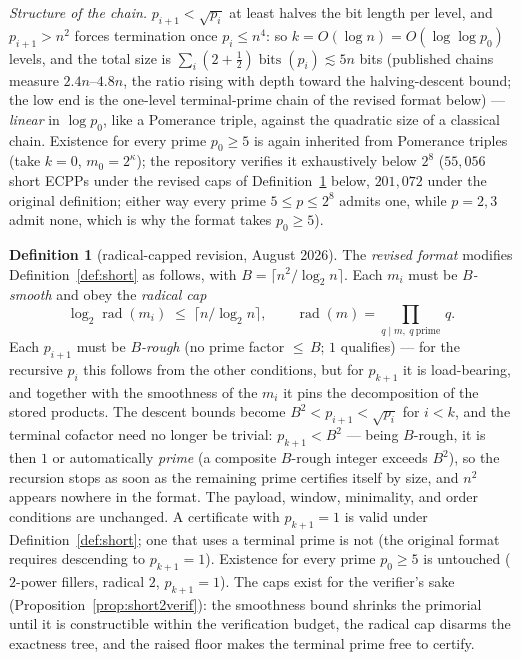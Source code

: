 \documentclass[11pt]{amsart}
\theoremstyle{plain}
\theoremstyle{definition}
\newtheorem{definition}[theorem]{Definition}
\theoremstyle{remark}
\begin{document}
\emph{Structure of the chain.}  $p_{i+1} < \sqrt{p_i}$ at least halves the bit length per level, and
$p_{i+1} > n^2$ forces termination once $p_i \le n^4$: so $k = O(\log n) = O(\log\log p_0)$ levels, and
the total size is $\sum_i (2+\tfrac12)\operatorname{bits}(p_i) \lesssim 5n$ bits (published chains
measure $2.4n$--$4.8n$, the ratio rising with depth toward the halving-descent bound; the low end is the one-level terminal-prime chain of the revised format below) --- \emph{linear}
in $\log p_0$, like a Pomerance triple, against the quadratic size of a classical chain.  Existence for
every prime $p_0 \ge 5$ is again inherited from Pomerance triples (take $k = 0$,
$m_0 = 2^{\kappa}$); the repository verifies it exhaustively below $2^8$ ($55{,}056$ short ECPPs under the revised caps of Definition~\ref{def:short2} below, $201{,}072$ under the original definition; either way every
prime $5 \le p \le 2^8$ admits one, while $p = 2, 3$ admit none, which is why the format takes
$p_0 \ge 5$).

\begin{definition}[radical-capped revision, August 2026]\label{def:short2}
The \emph{revised format} modifies Definition~\ref{def:short} as follows, with
$B = \lceil n^2/\log_2 n\rceil$.  Each $m_i$ must be \emph{$B$-smooth} and obey the
\emph{radical cap}
\[
  \log_2 \operatorname{rad}(m_i) \;\le\; \lceil n/\log_2 n\rceil,
  \qquad \operatorname{rad}(m) = \textstyle\prod_{q \mid m,\ q\ \mathrm{prime}}\, q.
\]
Each $p_{i+1}$ must be \emph{$B$-rough} (no prime factor ${\le}\,B$; $1$ qualifies) --- for the
recursive $p_i$ this follows from the other conditions, but for $p_{k+1}$ it is load-bearing, and
together with the smoothness of the $m_i$ it pins the decomposition of the stored products.  The
descent bounds become $B^2 < p_{i+1} < \sqrt{p_i}$ for $i < k$, and the terminal cofactor need no
longer be trivial: $p_{k+1} < B^2$ --- being $B$-rough, it is then $1$ or automatically \emph{prime}
(a composite $B$-rough integer exceeds $B^2$), so the recursion stops as soon as the remaining
prime certifies itself by size, and $n^2$ appears nowhere in the format.  The payload, window,
minimality, and order conditions are unchanged.  A certificate with $p_{k+1} = 1$ is valid under
Definition~\ref{def:short}; one that uses a terminal prime is not (the original format requires
descending to $p_{k+1} = 1$).  Existence for every prime $p_0 \ge 5$ is untouched ($2$-power fillers,
radical $2$, $p_{k+1} = 1$).  The caps exist for the verifier's sake
(Proposition~\ref{prop:short2verif}): the smoothness bound shrinks the primorial until it is
constructible within the verification budget, the radical cap disarms the exactness tree, and the
raised floor makes the terminal prime free to certify.
\end{definition}
\end{document}
